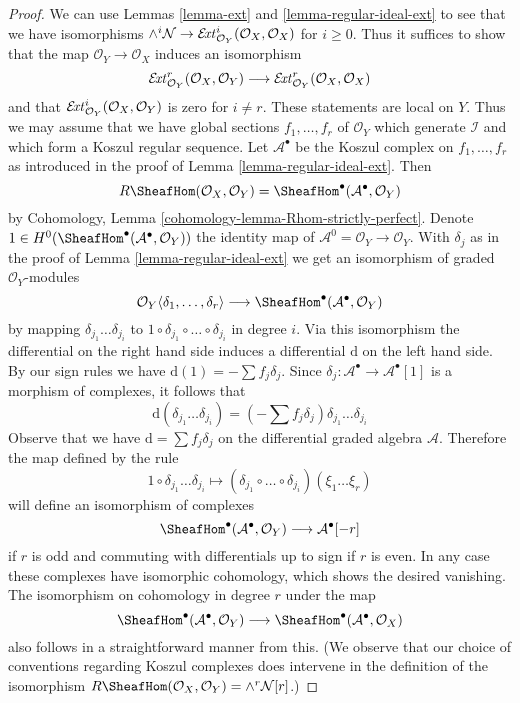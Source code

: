 \begin{proof}
We can use Lemmas \ref{lemma-ext} and \ref{lemma-regular-ideal-ext}
to see that we have isomorphisms
$\wedge^i\mathcal{N} \to
\mathcal{E}\!{\it xt}^i_{\mathcal{O}_Y}(\mathcal{O}_X, \mathcal{O}_X)$
for $i \geq 0$. Thus it suffices to show that the map
$\mathcal{O}_Y \to \mathcal{O}_X$ induces an isomorphism
$$
\mathcal{E}\!{\it xt}^r_{\mathcal{O}_Y}(\mathcal{O}_X, \mathcal{O}_Y)
\longrightarrow
\mathcal{E}\!{\it xt}^r_{\mathcal{O}_Y}(\mathcal{O}_X, \mathcal{O}_X)
$$
and that
$\mathcal{E}\!{\it xt}^i_{\mathcal{O}_Y}(\mathcal{O}_X, \mathcal{O}_Y)$
is zero for $i \not = r$. These statements are local on $Y$. Thus
we may assume that we have global sections $f_1, \ldots, f_r$ of
$\mathcal{O}_Y$ which generate $\mathcal{I}$ and which form a
Koszul regular sequence. Let $\mathcal{A}^\bullet$
be the Koszul complex on $f_1, \ldots, f_r$ as introduced in the proof of
Lemma \ref{lemma-regular-ideal-ext}. Then
$$
R\SheafHom(\mathcal{O}_X, \mathcal{O}_Y) =
\SheafHom^\bullet(\mathcal{A}^\bullet, \mathcal{O}_Y)
$$
by Cohomology, Lemma \ref{cohomology-lemma-Rhom-strictly-perfect}.
Denote $1 \in H^0(\SheafHom^\bullet(\mathcal{A}^\bullet, \mathcal{O}_Y))$
the identity map of $\mathcal{A}^0 = \mathcal{O}_Y \to \mathcal{O}_Y$.
With $\delta_j$ as in the proof of Lemma \ref{lemma-regular-ideal-ext}
we get an isomorphism of graded $\mathcal{O}_Y$-modules
$$
\mathcal{O}_Y\langle \delta_1, \ldots, \delta_r\rangle
\longrightarrow
\SheafHom^\bullet(\mathcal{A}^\bullet, \mathcal{O}_Y)
$$
by mapping $\delta_{j_1} \ldots \delta_{j_i}$ to
$1 \circ \delta_{j_1} \circ \ldots \circ \delta_{j_i}$ in degree $i$.
Via this isomorphism the differential on the right hand side
induces a differential $\text{d}$ on the left hand side.
By our sign rules we have $\text{d}(1) = - \sum f_j \delta_j$.
Since $\delta_j : \mathcal{A}^\bullet \to \mathcal{A}^\bullet[1]$
is a morphism of complexes, it follows that
$$
\text{d}(\delta_{j_1} \ldots \delta_{j_i}) =
(- \sum f_j \delta_j )\delta_{j_1} \ldots \delta_{j_i}
$$
Observe that we have $\text{d} = \sum f_j \delta_j$ on the differential
graded algebra $\mathcal{A}$. Therefore the map defined by the rule
$$
1 \circ \delta_{j_1} \ldots \delta_{j_i} \longmapsto
(\delta_{j_1} \circ \ldots \circ \delta_{j_i})(\xi_1 \ldots \xi_r)
$$
will define an isomorphism of complexes
$$
\SheafHom^\bullet(\mathcal{A}^\bullet, \mathcal{O}_Y)
\longrightarrow \mathcal{A}^\bullet[-r]
$$
if $r$ is odd and commuting with differentials up to sign if $r$ is even.
In any case these complexes have isomorphic cohomology, which shows the
desired vanishing. The isomorphism on cohomology in degree $r$
under the map
$$
\SheafHom^\bullet(\mathcal{A}^\bullet, \mathcal{O}_Y)
\longrightarrow
\SheafHom^\bullet(\mathcal{A}^\bullet, \mathcal{O}_X)
$$
also follows in a straightforward manner from this.
(We observe that our choice of conventions regarding
Koszul complexes does intervene in the definition
of the isomorphism
$R\SheafHom(\mathcal{O}_X, \mathcal{O}_Y) = \wedge^r \mathcal{N}[r]$.)
\end{proof}

